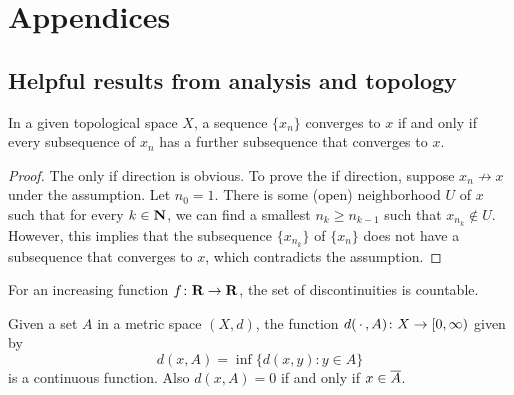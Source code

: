 \chapter*{\Large Appendices}
\makeatletter
\renewcommand\thesection{\@Alph\c@section}
\makeatother

\section{Helpful results from analysis and topology} \label{sec:helpful-analysis}
\begin{prop} \label{prop:subseq-further-subseq-top-space}
    In a given topological space $X$, a sequence $\{x_n\}$ converges to $x$ if and only if every subsequence of $x_n$ has a further subsequence that converges to $x$.
\end{prop}
\begin{proof}
    The only if direction is obvious. To prove the if direction, suppose $x_n \not\to x$ under the assumption. Let $n_0 = 1$. There is some (open) neighborhood $U$ of $x$ such that for every $k\in \mathbf{N}$, we can find a smallest $n_k \geq n_{k-1}$ such that $x_{n_k} \notin U$. However, this implies that the subsequence $\{x_{n_k}\}$ of $\{x_n\}$ does not have a subsequence that converges to $x$, which contradicts the assumption.
\end{proof}



\begin{prop}
    
\end{prop}

\begin{prop} \label{prop:discont-countable}
    For an increasing function $f\colon \mathbf{R}\to \mathbf{R}$, the set of discontinuities is countable.
\end{prop}

\begin{prop}\label{prop:dist-set-cont}
    Given a set $A$ in a metric space $(X,d)$, the function $d(\,\cdot\,,A)\colon X \to [0,\infty)$ given by \[
        d(x,A) = \inf\{d(x,y) : y\in A\}
    \] is a continuous function. Also $d(x,A) = 0$ if and only if $x \in \overline{A}$.
\end{prop}


